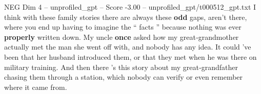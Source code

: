 \begin{textsample}{NEG Dim 4 – unprofiled\_gpt – Score -3.00 – unprofiled\_gpt/t000512\_gpt.txt}  \label{ex:f4_neg_030}
I think with these family stories there are always these \textbf{odd} gaps, aren't there, where you end up having to imagine the “ facts ” because nothing was ever \textbf{properly} written down.
My uncle \textbf{once} asked how my great‑grandmother actually met the man she went off with, and nobody has any idea.
It could ’ve been that her husband introduced them, or that they met when he was there on military training.
And then there ’s this story about my great‑grandfather chasing them through a station, which nobody can verify or even remember where it came from.

\end{textsample}
